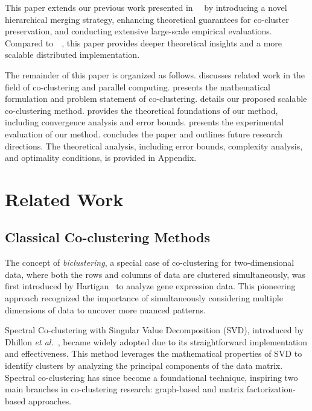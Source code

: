 \documentclass[journal]{IEEEtran}
\theoremstyle{definition}
\theoremstyle{remark} %
\renewcommand{\cite}[1]{~\autocite{#1}}
\begin{document}
This paper extends our previous work presented in~\cite{wu2024ScalableCoClusteringLargeScale} by introducing a novel hierarchical merging strategy, enhancing theoretical guarantees for co-cluster preservation, and conducting extensive large-scale empirical evaluations. Compared to~\cite{wu2024ScalableCoClusteringLargeScale}, this paper provides deeper theoretical insights and a more scalable distributed implementation.

The remainder of this paper is organized as follows.  discusses related work in the field of co-clustering and parallel computing.  presents the mathematical formulation and problem statement of co-clustering.  details our proposed scalable co-clustering method.  provides the theoretical foundations of our method, including convergence analysis and error bounds.  presents the experimental evaluation of our method.  concludes the paper and outlines future research directions. The theoretical analysis, including error bounds, complexity analysis, and optimality conditions, is provided in Appendix.

\section{Related Work}
\label{sec:related-work}
\subsection{Classical Co-clustering Methods}
The concept of \emph{biclustering}, a special case of co-clustering for two-dimensional data, where both the rows and columns of data are clustered simultaneously, was first introduced by Hartigan\cite{hartigan1972DirectClusteringData} to analyze gene expression data. This pioneering approach recognized the importance of simultaneously considering multiple dimensions of data to uncover more nuanced patterns.

Spectral Co-clustering with Singular Value Decomposition (SVD), introduced by Dhillon \textit{et al.}\cite{dhillon2001CoclusteringDocumentsWords}, became widely adopted due to its straightforward implementation and effectiveness. This method leverages the mathematical properties of SVD to identify clusters by analyzing the principal components of the data matrix. Spectral co-clustering has since become a foundational technique, inspiring two main branches in co-clustering research: graph-based and matrix factorization-based approaches.
\end{document}
